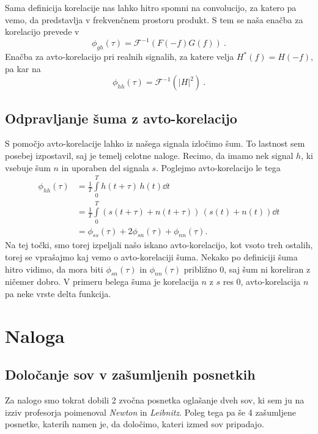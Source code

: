 \documentclass{porocilo}
\newcommand{\intc}{\frac{1}{T}\int\limits_0^{T}}
\begin{document}
Sama definicija korelacije nas lahko hitro spomni na convolucijo, za katero pa vemo, da predstavlja v frekvenčnem prostoru produkt. S tem se naša enačba za korelacijo prevede v
\begin{equation*}
    \phi_{gh}(\tau) = \mathcal{F}^{-1} (F(-f) G(f))  \>.
\end{equation*}
Enačba za avto-korelacijo pri realnih signalih, za katere velja $H^*(f) = H(-f)$, pa kar na
\begin{equation*}
    \phi_{hh}(\tau) = \mathcal{F}^{-1} (|H|^2)  \>.
\end{equation*}

\subsection{Odpravljanje šuma z avto-korelacijo}
S pomočjo avto-korelacije lahko iz našega signala izločimo šum. To lastnost sem posebej izpostavil, saj je temelj celotne naloge. Recimo, da imamo nek signal $h$, ki vsebuje šum $n$ in uporaben del signala $s$. Poglejmo avto-korelacijo le tega
\begin{align*}
    \phi_{hh}(\tau) & = \intc h(t+\tau)\,h(t)\dd t                             \\
                    & = \intc (s(t+\tau) + n(t+\tau))\,(s(t) + n(t))\dd t      \\
                    & = \phi_{ss}(\tau) + 2 \phi_{sn}(\tau) + \phi_{nn}(\tau).
\end{align*}
Na tej točki, smo torej izpeljali našo iskano avto-korelacijo, kot vsoto treh ostalih, torej se vprašajmo kaj vemo o avto-korelaciji šuma. Nekako po definiciji šuma hitro vidimo, da mora biti $\phi_{sn}(\tau)$ in $\phi_{nn}(\tau)$ približno 0, saj šum ni koreliran z ničemer dobro. V primeru belega šuma je korelacija $n$ z $s$ res 0, avto-korelacija $n$ pa neke vrste delta funkcija.

\section{Naloga}
\subsection{Določanje sov v zašumljenih posnetkih}
Za nalogo smo tokrat dobili 2 zvočna posnetka oglašanje dveh sov, ki sem ju na izziv profesorja poimenoval \textit{Newton} in \textit{Leibnitz}. Poleg tega pa še 4 zašumljene posnetke, katerih namen je, da določimo, kateri izmed sov pripadajo.
\end{document}
